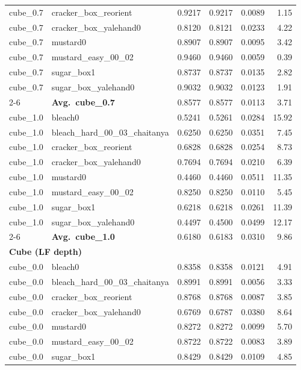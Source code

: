 \begin{longtable}{llrrrr}
  cube_0.7 & cracker\_box\_reorient & 0.9217 & 0.9217 & 0.0089 & 1.15 \\
  cube_0.7 & cracker\_box\_yalehand0 & 0.8120 & 0.8121 & 0.0233 & 4.22 \\
  cube_0.7 & mustard0 & 0.8907 & 0.8907 & 0.0095 & 3.42 \\
  cube_0.7 & mustard\_easy\_00\_02 & 0.9460 & 0.9460 & 0.0059 & 0.39 \\
  cube_0.7 & sugar\_box1 & 0.8737 & 0.8737 & 0.0135 & 2.82 \\
  cube_0.7 & sugar\_box\_yalehand0 & 0.9032 & 0.9032 & 0.0123 & 1.91 \\
  \cmidrule{2-6}
  & \textbf{Avg.~cube_0.7} & 0.8577 & 0.8577 & 0.0113 & 3.71 \\
  \midrule
  cube_1.0 & bleach0 & 0.5241 & 0.5261 & 0.0284 & 15.92 \\
  cube_1.0 & bleach\_hard\_00\_03\_chaitanya & 0.6250 & 0.6250 & 0.0351 & 7.45 \\
  cube_1.0 & cracker\_box\_reorient & 0.6828 & 0.6828 & 0.0254 & 8.73 \\
  cube_1.0 & cracker\_box\_yalehand0 & 0.7694 & 0.7694 & 0.0210 & 6.39 \\
  cube_1.0 & mustard0 & 0.4460 & 0.4460 & 0.0511 & 11.35 \\
  cube_1.0 & mustard\_easy\_00\_02 & 0.8250 & 0.8250 & 0.0110 & 5.45 \\
  cube_1.0 & sugar\_box1 & 0.6218 & 0.6218 & 0.0261 & 11.39 \\
  cube_1.0 & sugar\_box\_yalehand0 & 0.4497 & 0.4500 & 0.0499 & 12.17 \\
  \cmidrule{2-6}
  & \textbf{Avg.~cube_1.0} & 0.6180 & 0.6183 & 0.0310 & 9.86 \\
  \midrule
\multicolumn{6}{l}{\textbf{Cube (LF depth)}} \\
\midrule
  cube_0.0 & bleach0 & 0.8358 & 0.8358 & 0.0121 & 4.91 \\
  cube_0.0 & bleach\_hard\_00\_03\_chaitanya & 0.8991 & 0.8991 & 0.0056 & 3.33 \\
  cube_0.0 & cracker\_box\_reorient & 0.8768 & 0.8768 & 0.0087 & 3.85 \\
  cube_0.0 & cracker\_box\_yalehand0 & 0.6769 & 0.6787 & 0.0380 & 8.64 \\
  cube_0.0 & mustard0 & 0.8272 & 0.8272 & 0.0099 & 5.70 \\
  cube_0.0 & mustard\_easy\_00\_02 & 0.8722 & 0.8722 & 0.0083 & 3.89 \\
  cube_0.0 & sugar\_box1 & 0.8429 & 0.8429 & 0.0109 & 4.85 \\

\end{longtable}
